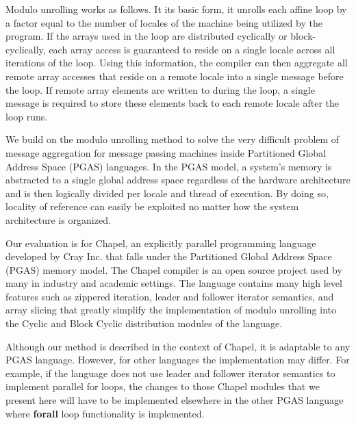 Modulo unrolling works as follows. It its basic form, it unrolls each affine loop by a factor equal to the number of locales of the machine being utilized by the program. If the arrays used in the loop are distributed cyclically or block-cyclically, each array access is guaranteed to reside on a single locale across all iterations of the loop. Using this information, the compiler can then aggregate all remote array accesses that reside on a remote locale into a single message before the loop. If remote array elements are written to during the loop, a single message is required to store these elements back to each remote locale after the loop runs. 

We build on the modulo unrolling method to solve the very difficult problem of message aggregation for message passing machines inside Partitioned Global Address Space (PGAS) languages. In the PGAS model, a system's memory is abstracted to a single global address space regardless of the hardware architecture and is then logically divided per locale and thread of execution. By doing so, locality of reference can easily be exploited no matter how the system architecture is organized.

Our evaluation is for Chapel, an explicitly parallel programming language developed by Cray Inc. that falls under the Partitioned Global Address Space (PGAS) memory model. The Chapel compiler is an open source project used by many in industry and academic settings. The language contains many high level features such as zippered iteration, leader and follower iterator semantics, and array slicing that greatly simplify the implementation of modulo unrolling into the Cyclic and Block Cyclic distribution modules of the language.

Although our method is described in the context of Chapel, it is adaptable to any PGAS language. However, for other languages the implementation may differ. For example, if the language does not use leader and follower iterator semantics to implement parallel for loops, the changes to those Chapel modules that we present here will have to be implemented elsewhere in the other PGAS language where \textbf{forall} loop functionality is implemented.